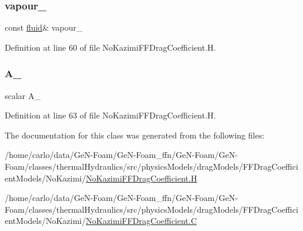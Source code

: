 \subsubsection{\texorpdfstring{vapour\+\_\+}{vapour\_}}
{\footnotesize\ttfamily const \hyperlink{classFoam_1_1fluid}{fluid}\& vapour\+\_\+\hspace{0.3cm}{\ttfamily [protected]}}



Definition at line 60 of file No\+Kazimi\+F\+F\+Drag\+Coefficient.\+H.

\mbox{\label{classFoam_1_1FFDragCoefficientModels_1_1NoKazimi_a470f484be0b7ecd159b0971e3023a490}} 
\subsubsection{\texorpdfstring{A\+\_\+}{A\_}}
{\footnotesize\ttfamily scalar A\+\_\+\hspace{0.3cm}{\ttfamily [protected]}}



Definition at line 63 of file No\+Kazimi\+F\+F\+Drag\+Coefficient.\+H.



The documentation for this class was generated from the following files\+:\begin{DoxyCompactItemize}
\item 
/home/carlo/data/\+Ge\+N-\/\+Foam/\+Ge\+N-\/\+Foam\+\_\+ffn/\+Ge\+N-\/\+Foam/\+Ge\+N-\/\+Foam/classes/thermal\+Hydraulics/src/physics\+Models/drag\+Models/\+F\+F\+Drag\+Coefficient\+Models/\+No\+Kazimi/\hyperlink{NoKazimiFFDragCoefficient_8H}{No\+Kazimi\+F\+F\+Drag\+Coefficient.\+H}\item 
/home/carlo/data/\+Ge\+N-\/\+Foam/\+Ge\+N-\/\+Foam\+\_\+ffn/\+Ge\+N-\/\+Foam/\+Ge\+N-\/\+Foam/classes/thermal\+Hydraulics/src/physics\+Models/drag\+Models/\+F\+F\+Drag\+Coefficient\+Models/\+No\+Kazimi/\hyperlink{NoKazimiFFDragCoefficient_8C}{No\+Kazimi\+F\+F\+Drag\+Coefficient.\+C}\end{DoxyCompactItemize}
